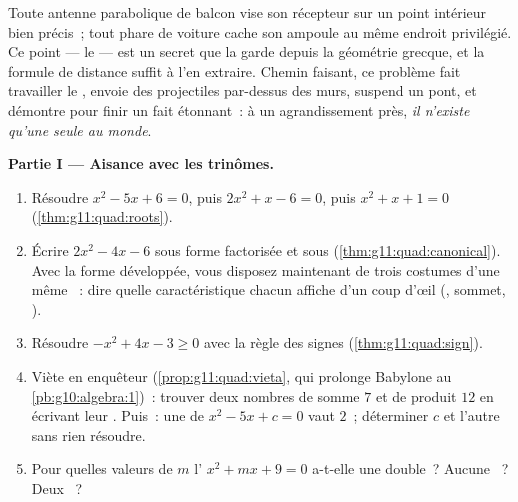 \begin{problem}
\label{pb:g11:quad:1}
Toute antenne parabolique de balcon vise son récepteur sur un point
intérieur bien précis~; tout phare de voiture cache son ampoule au
même endroit privilégié. Ce point --- le \emph{} --- est un
secret que la  garde depuis la géométrie grecque, et la
formule de distance suffit à l'en extraire. Chemin faisant, ce
problème fait travailler le , envoie des projectiles
par-dessus des murs, suspend un pont, et démontre pour finir un fait
étonnant~: à un agrandissement près, \emph{il n'existe qu'une seule
 au monde}.

\medskip
\noindent\textbf{Partie I --- Aisance avec les trinômes.}
\begin{enumerate}
  \item Résoudre $x^2 - 5x + 6 = 0$, puis $2x^2 + x - 6 = 0$, puis
        $x^2 + x + 1 = 0$ (\cref{thm:g11:quad:roots}).
  \item Écrire $2x^2 - 4x - 6$ sous forme factorisée et sous  (\cref{thm:g11:quad:canonical}). Avec la forme
        développée, vous disposez maintenant de trois costumes d'une
        même ~: dire quelle caractéristique chacun affiche
        d'un coup d'œil (, sommet, ).
  \item Résoudre $-x^2 + 4x - 3 \geq 0$ avec la règle des signes
        (\cref{thm:g11:quad:sign}).
  \item Viète en enquêteur (\cref{prop:g11:quad:vieta}, qui
        prolonge Babylone au \cref{pb:g10:algebra:1})~: trouver deux
        nombres de somme $7$ et de produit $12$ en écrivant leur
        . Puis~: une  de $x^2 - 5x + c = 0$ vaut $2$~;
        déterminer $c$ et l'autre  sans rien résoudre.
  \item Pour quelles valeurs de $m$ l' $x^2 + mx + 9 = 0$
        a-t-elle une  double~? Aucune ~? Deux ~?
\end{enumerate}


\end{problem}
